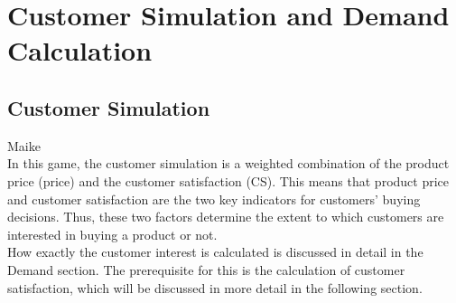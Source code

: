 \section{Customer Simulation and Demand Calculation}
\label{sec:customsim}
\subsection{Customer Simulation}
Maike\\
In this game, the customer simulation is a weighted combination of the product price (price) and the customer satisfaction (CS). %
This means that product price and customer satisfaction are the two key indicators for customers' buying decisions. Thus, these two factors determine the extent to which customers are interested in buying a product or not.\\ %

How exactly the customer interest is calculated is discussed in detail in the Demand section. The prerequisite for this is the calculation of customer satisfaction, which will be discussed in more detail in the following section.\\



